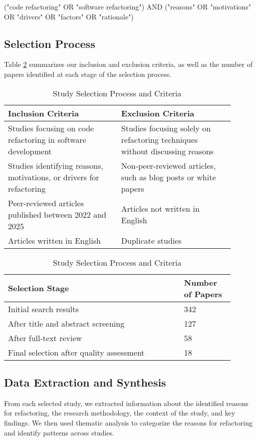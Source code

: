 \documentclass[journal,onecolumn]{IEEEtran}
\begin{document}
("code refactoring" OR "software refactoring") AND ("reasons" OR "motivations" OR "drivers" OR "factors" OR "rationale")

\subsection{Selection Process}
Table \ref{tab:selection} summarizes our inclusion and exclusion criteria, as well as the number of papers identified at each stage of the selection process.

\begin{table}[htbp]
\caption{Study Selection Process and Criteria}
\label{tab:selection}
\centering
\begin{tabular}{p{0.45\linewidth}|p{0.45\linewidth}}
\toprule
\textbf{Inclusion Criteria} & \textbf{Exclusion Criteria} \\
\midrule
Studies focusing on code refactoring in software development & Studies focusing solely on refactoring techniques without discussing reasons \\
\hline
Studies identifying reasons, motivations, or drivers for refactoring & Non-peer-reviewed articles, such as blog posts or white papers \\
\hline
Peer-reviewed articles published between 2022 and 2025 & Articles not written in English \\
\hline
Articles written in English & Duplicate studies \\
\bottomrule
\end{tabular}

\vspace{0.5cm}

\begin{tabular}{p{0.7\linewidth}|p{0.2\linewidth}}
\toprule
\textbf{Selection Stage} & \textbf{Number of Papers} \\
\midrule
Initial search results & 342 \\
\hline
After title and abstract screening & 127 \\
\hline
After full-text review & 58 \\
\hline
Final selection after quality assessment & 18 \\
\bottomrule
\end{tabular}
\end{table}

\subsection{Data Extraction and Synthesis}
From each selected study, we extracted information about the identified reasons for refactoring, the research methodology, the context of the study, and key findings. We then used thematic analysis to categorize the reasons for refactoring and identify patterns across studies.
\end{document}
